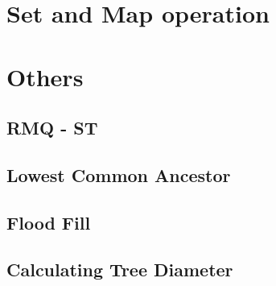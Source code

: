\section{Set and Map operation}
	
\section{Others}
	\subsection{RMQ - ST}
	\subsection{Lowest Common Ancestor}
	\subsection{Flood Fill}
	\subsection{Calculating Tree Diameter}
